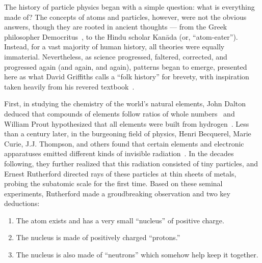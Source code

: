 \begin{dissertationintroduction}
The history of particle physics began with a simple question: what is everything made of? 
The concepts of atoms and particles, however, were not the obvious answers, though they are rooted in ancient thoughts --- from the Greek philosopher Democritus~\cite{Taylor1419554}, to the Hindu scholar Kan\=ada (or, ``atom-eater''). %
Instead, for a vast majority of human history, all theories were equally immaterial. 
Nevertheless, as science progressed, faltered, corrected, and progressed again (and again, and again), patterns began to emerge, presented here as what David Griffiths calls a ``folk history'' for brevety, with inspiration taken heavily from his revered textbook~\cite{Griffiths}.  

First, in studying the chemistry of the world's natural elements, John Dalton deduced that compounds of elements follow ratios of whole numbers~\cite{Dalton} and William Prout hypothesized that all elements were built from hydrogen~\cite{Prout}. 
Less than a century later, in the burgeoning field of physics, Henri Becquerel, Marie Curie, J.J. Thompson, and others found that certain elements and electronic apparatuses emitted different kinds of invisible radiation~\cite{Becquerel, Curie, RADVANYI2017544, Thompson}. 
In the decades following, they further realized that this radiation consisted of tiny particles\footnotemark{}, and Ernest Rutherford directed rays of these particles at thin sheets of metals, probing the subatomic scale for the first time. 
Based on these seminal experiments, Rutherford made a groudbreaking observation and two key deductions: %
\begin{enumerate}
    \item The atom exists\footnotemark{} and has a very small ``nucleus'' of positive charge.
    \item The nucleus is made of positively charged ``protons.''
    \item The nucleus is also made of ``neutrons'' which somehow help keep it together.
\end{enumerate}
\end{dissertationintroduction}
